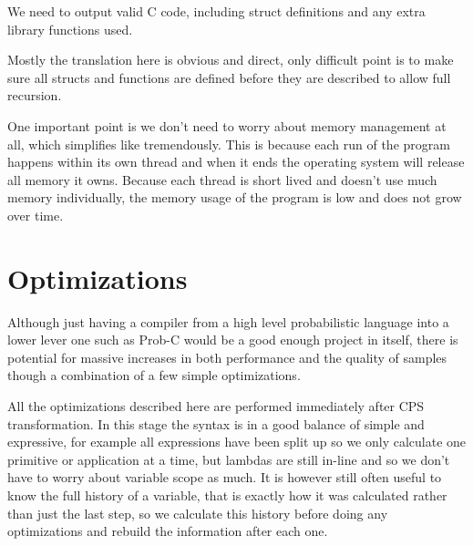 \documentclass[a4paper]{article}
\begin{document}
We need to output valid C code, including struct definitions and any extra library functions used.

Mostly the translation here is obvious and direct, only difficult point is to make sure all structs and functions are defined before they are described to allow full recursion.

One important point is we don't need to worry about memory management at all, which simplifies like tremendously. This is because each run of the program happens within its own thread and when it ends the operating system will release all memory it owns. Because each thread is short lived and doesn't use much memory individually, the memory usage of the program is low and does not grow over time.




\section{Optimizations}

Although just having a compiler from a high level probabilistic language into a lower lever one such as Prob-C would be a good enough project in itself, there is potential for massive increases in both performance and the quality of samples though a combination of a few simple optimizations.

All the optimizations described here are performed immediately after CPS transformation. In this stage the syntax is in a good balance of simple and expressive, for example all expressions have been split up so we only calculate one primitive or application at a time, but lambdas are still in-line and so we don't have to worry about variable scope as much. It is however still often useful to know the full history of a variable, that is exactly how it was calculated rather than just the last step, so we calculate this history before doing any optimizations and rebuild the information after each one.
\end{document}
